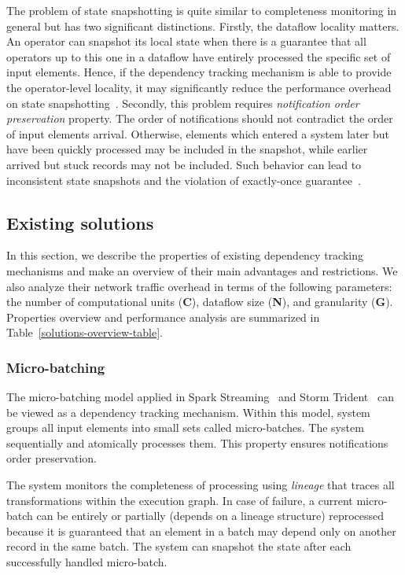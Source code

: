 The problem of state snapshotting is quite similar to completeness monitoring in general but has two significant distinctions. Firstly, the dataflow locality matters. An operator can snapshot its local state when there is a guarantee that all operators up to this one in a dataflow have entirely processed the specific set of input elements. Hence, if the dependency tracking mechanism is able to provide the operator-level locality, it may significantly reduce the performance overhead on state snapshotting~\cite{Carbone:2017:SMA:3137765.3137777}. Secondly, this problem requires {\em notification order preservation} property. The order of notifications should not contradict the order of input elements arrival. Otherwise, elements which entered a system later but have been quickly processed may be included in the snapshot, while earlier arrived but stuck records may not be included. Such behavior can lead to inconsistent state snapshots and the violation of exactly-once guarantee~\cite{2015arXiv150608603C}. 

\subsection{Existing solutions} \label{existing_solutions}

In this section, we describe the properties of existing dependency tracking mechanisms and make an overview of their main advantages and restrictions. We also analyze their network traffic overhead in terms of the following parameters: the number of computational units (\textbf{C}), dataflow size (\textbf{N}), and granularity (\textbf{G}). Properties overview and performance analysis are summarized in Table~\ref{solutions-overview-table}.

\subsubsection{Micro-batching}

The micro-batching model applied in Spark Streaming~\cite{Zaharia:2012:DSE:2342763.2342773} and Storm Trident~\cite{apache:storm:trident} can be viewed as a dependency tracking mechanism. Within this model, system groups all input elements into small sets called micro-batches. The system sequentially and atomically processes them. This property ensures notifications order preservation. 

The system monitors the completeness of processing using {\em lineage} that traces all transformations within the execution graph. In case of failure, a current micro-batch can be entirely or partially (depends on a lineage structure) reprocessed because it is guaranteed that an element in a batch may depend only on another record in the same batch. The system can snapshot the state after each successfully handled micro-batch. 

